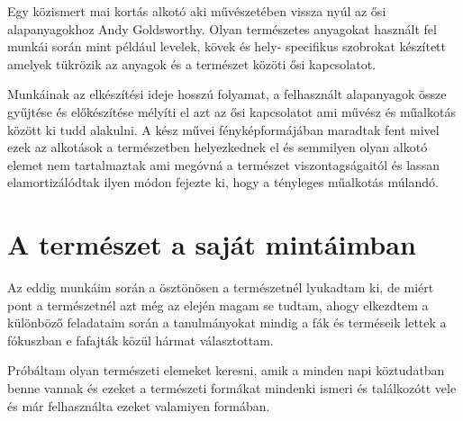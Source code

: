 \documentclass[fontsize=12pt, appendixprefix=true]{scrreprt}
\begin{document}
\vspace{3 mm}
Egy közismert mai kortás alkotó aki művészetében vissza nyúl az ősi alapanyagokhoz Andy Goldsworthy. Olyan természetes anyagokat használt fel munkái során mint például levelek, kövek és hely- specifikus szobrokat készített amelyek tükrözik az anyagok és a természet közöti ősi kapcsolatot.

Munkáinak az elkészítési ideje hosszú folyamat, a felhasznált  alapanyagok össze gyűjtése és előkészítése mélyíti el azt az ősi kapcsolatot ami művész és műalkotás között ki tudd alakulni.
A kész művei fényképformájában maradtak fent mivel ezek az alkotások a természetben helyezkednek el és semmilyen olyan alkotó elemet nem tartalmaztak ami megóvná a természet viszontagságaitól és lassan elamortizálódtak ilyen módon fejezte ki, hogy a tényleges műalkotás múlandó.



\section{A természet a saját mintáimban}
Az eddig munkáim során a ösztönösen a természetnél lyukadtam ki, de miért pont a természetnél azt még az elején magam se tudtam, ahogy elkezdtem a különböző feladataim során a tanulmányokat mindig a fák és terméseik lettek a fókuszban e fafajták közül hármat választottam.

Próbáltam olyan természeti elemeket keresni, amik a minden napi köztudatban benne vannak és ezeket a természeti formákat mindenki ismeri és találkozótt vele és már felhasználta ezeket valamiyen formában. 
\end{document}
